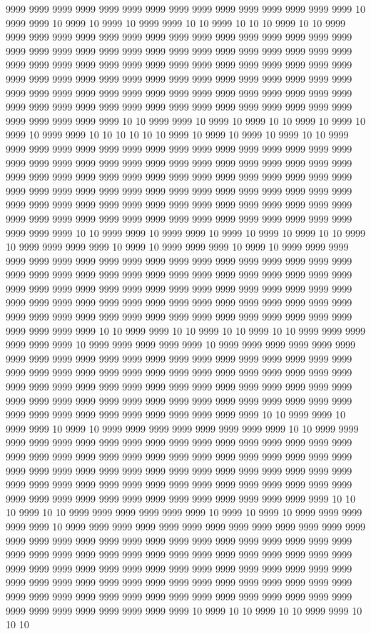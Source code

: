 9999 9999 9999 9999 9999 9999 9999 9999 9999 9999 9999 9999 9999 9999 9999 10 9999 9999 10 9999 10 9999 10 9999 9999 10 10 9999 10 10 10 9999 10 10 9999 9999 9999 9999 9999 9999 9999 9999 9999 9999 9999 9999 9999 9999 9999 9999 9999 9999 9999 9999 9999 9999 9999 9999 9999 9999 9999 9999 9999 9999 9999 9999 9999 9999 9999 9999 9999 9999 9999 9999 9999 9999 9999 9999 9999 9999 9999 9999 9999 9999 9999 9999 9999 9999 9999 9999 9999 9999 9999 9999 9999 9999 9999 9999 9999 9999 9999 9999 9999 9999 9999 9999 9999 9999 9999 9999 9999 9999 9999 9999 9999 9999 9999 9999 9999 9999 9999 9999 9999 9999 9999 9999 9999 9999 9999 9999 10 10 9999 9999 10 9999 10 9999 10 10 9999 10 9999 10 9999 10 9999 9999 10 10 10 10 10 10 9999 10 9999 10 9999 10 9999 10 10 9999 9999 9999 9999 9999 9999 9999 9999 9999 9999 9999 9999 9999 9999 9999 9999 9999 9999 9999 9999 9999 9999 9999 9999 9999 9999 9999 9999 9999 9999 9999 9999 9999 9999 9999 9999 9999 9999 9999 9999 9999 9999 9999 9999 9999 9999 9999 9999 9999 9999 9999 9999 9999 9999 9999 9999 9999 9999 9999 9999 9999 9999 9999 9999 9999 9999 9999 9999 9999 9999 9999 9999 9999 9999 9999 9999 9999 9999 9999 9999 9999 9999 9999 9999 9999 9999 9999 9999 9999 9999 9999 9999 9999 9999 10 10 9999 9999 10 9999 9999 10 9999 10 9999 10 9999 10 10 9999 10 9999 9999 9999 9999 10 9999 10 9999 9999 9999 10 9999 10 9999 9999 9999 9999 9999 9999 9999 9999 9999 9999 9999 9999 9999 9999 9999 9999 9999 9999 9999 9999 9999 9999 9999 9999 9999 9999 9999 9999 9999 9999 9999 9999 9999 9999 9999 9999 9999 9999 9999 9999 9999 9999 9999 9999 9999 9999 9999 9999 9999 9999 9999 9999 9999 9999 9999 9999 9999 9999 9999 9999 9999 9999 9999 9999 9999 9999 9999 9999 9999 9999 9999 9999 9999 9999 9999 9999 9999 9999 9999 9999 9999 9999 10 10 9999 9999 10 10 9999 10 10 9999 10 10 9999 9999 9999 9999 9999 9999 10 9999 9999 9999 9999 9999 10 9999 9999 9999 9999 9999 9999 9999 9999 9999 9999 9999 9999 9999 9999 9999 9999 9999 9999 9999 9999 9999 9999 9999 9999 9999 9999 9999 9999 9999 9999 9999 9999 9999 9999 9999 9999 9999 9999 9999 9999 9999 9999 9999 9999 9999 9999 9999 9999 9999 9999 9999 9999 9999 9999 9999 9999 9999 9999 9999 9999 9999 9999 9999 9999 9999 9999 9999 9999 9999 9999 9999 9999 9999 9999 9999 9999 9999 10 10 9999 9999 10 9999 9999 10 9999 10 9999 9999 9999 9999 9999 9999 9999 9999 10 10 9999 9999 9999 9999 9999 9999 9999 9999 9999 9999 9999 9999 9999 9999 9999 9999 9999 9999 9999 9999 9999 9999 9999 9999 9999 9999 9999 9999 9999 9999 9999 9999 9999 9999 9999 9999 9999 9999 9999 9999 9999 9999 9999 9999 9999 9999 9999 9999 9999 9999 9999 9999 9999 9999 9999 9999 9999 9999 9999 9999 9999 9999 9999 9999 9999 9999 9999 9999 9999 9999 9999 9999 9999 9999 9999 9999 10 10 10 9999 10 10 9999 9999 9999 9999 9999 9999 10 9999 10 9999 10 9999 9999 9999 9999 9999 10 9999 9999 9999 9999 9999 9999 9999 9999 9999 9999 9999 9999 9999 9999 9999 9999 9999 9999 9999 9999 9999 9999 9999 9999 9999 9999 9999 9999 9999 9999 9999 9999 9999 9999 9999 9999 9999 9999 9999 9999 9999 9999 9999 9999 9999 9999 9999 9999 9999 9999 9999 9999 9999 9999 9999 9999 9999 9999 9999 9999 9999 9999 9999 9999 9999 9999 9999 9999 9999 9999 9999 9999 9999 9999 9999 9999 9999 9999 9999 9999 9999 9999 9999 9999 9999 9999 9999 9999 9999 9999 9999 9999 9999 9999 9999 9999 10 9999 10 10 9999 10 10 9999 9999 10 10 10 